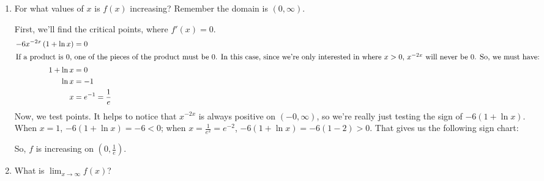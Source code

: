 \documentclass{article}
\begin{document}
\begin{enumerate}
\begin{enumerate}
    \pspace{\newpage}

  \item
    \begin{problem}[\vfill]
      For what values of $x$ is $f(x)$ increasing?  Remember the domain is $(0, \infty)$.
    \end{problem}

    \begin{solution}

      First, we'll find the critical points, where $f'(x) = 0$.
      \begin{align*}
        -6 x^{-2x} \left( 1 + \ln x \right) &= 0 \\
        \intertext{If a product is 0, one of the pieces of the product
          must be 0.  In this case, since we're only interested in where
          $x > 0$, $x^{-2x}$ will never be 0.  So, we must have:}
        1 + \ln x &= 0 \\
        \ln x &= -1 \\
        x &= e^{-1} = \frac{1}{e}
      \end{align*}
      Now, we test points.  It helps to notice that $x^{-2x}$ is always
      positive on $(-0, \infty)$, so we're really just testing the sign
      of $-6(1 + \ln x)$.  When $x = 1$, $-6 (1 + \ln x) = -6 < 0$; when
      $x = \frac{1}{e^2} = e^{-2}$, $-6(1 + \ln x) = -6 (1 - 2) > 0$.
      That gives us the following sign chart: 
      \begin{center}
      \end{center}
      So, $f$ is increasing on $\boxed{\left(0, \frac{1}{e} \right)}$.  
    \end{solution}

  \item
    \begin{problem}[0.5in]
      What is $\displaystyle \lim_{x \to \infty} f(x)$? 
    \end{problem}


\end{enumerate}
\end{enumerate}
\end{document}
